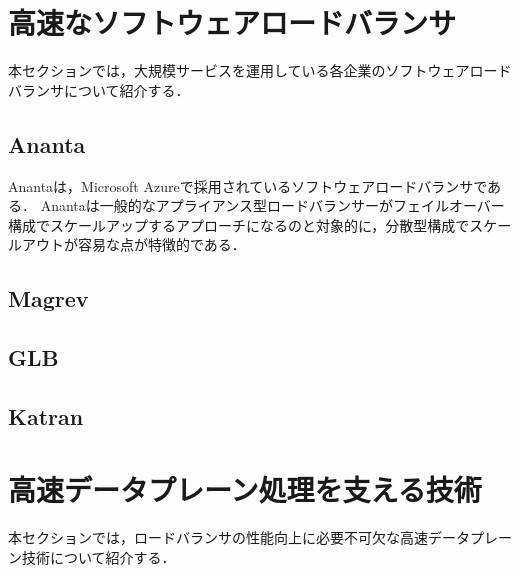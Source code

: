 



\section{高速なソフトウェアロードバランサ}
\label{related:rapidlb}
本セクションでは，大規模サービスを運用している各企業のソフトウェアロードバランサについて紹介する．
\subsection{Ananta}
Anantaは，Microsoft Azureで採用されているソフトウェアロードバランサである．
Anantaは一般的なアプライアンス型ロードバランサーがフェイルオーバー構成でスケールアップするアプローチになるのと対象的に，分散型構成でスケールアウトが容易な点が特徴的である．


\subsection{Magrev}

\subsection{GLB}

\subsection{Katran}


\section{高速データプレーン処理を支える技術}
\label{related:a-dplane}
本セクションでは，ロードバランサの性能向上に必要不可欠な高速データプレーン技術について紹介する．

